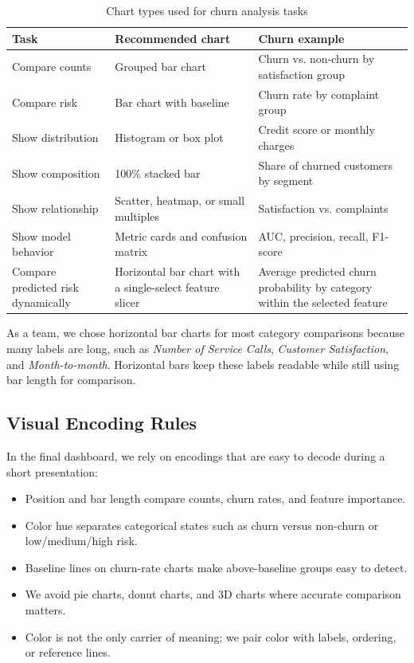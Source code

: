 \begin{table}[h]
\centering
\caption{Chart types used for churn analysis tasks}
\begin{tabularx}{\textwidth}{p{}p{}X}
\toprule
\textbf{Task} & \textbf{Recommended chart} & \textbf{Churn example} \\
\midrule
Compare counts & Grouped bar chart & Churn vs. non-churn by satisfaction group \\
Compare risk & Bar chart with baseline & Churn rate by complaint group \\
Show distribution & Histogram or box plot & Credit score or monthly charges \\
Show composition & 100\% stacked bar & Share of churned customers by segment \\
Show relationship & Scatter, heatmap, or small multiples & Satisfaction vs. complaints \\
Show model behavior & Metric cards and confusion matrix & AUC, precision, recall, F1-score \\
Compare predicted risk dynamically & Horizontal bar chart with a single-select feature slicer & Average predicted churn probability by category within the selected feature \\
\bottomrule
\end{tabularx}
\end{table}

As a team, we chose horizontal bar charts for most category comparisons because
many labels are long, such as \textit{Number of Service Calls},
\textit{Customer Satisfaction}, and \textit{Month-to-month}. Horizontal bars
keep these labels readable while still using bar length for comparison.

\subsection{Visual Encoding Rules}
In the final dashboard, we rely on encodings that are easy to decode during a
short presentation:
\begin{itemize}
  \item Position and bar length compare counts, churn rates, and
  feature importance.
  \item Color hue separates categorical states such as churn versus
  non-churn or low/medium/high risk.
  \item Baseline lines on churn-rate charts make above-baseline groups easy to
  detect.
  \item We avoid pie charts, donut charts, and 3D charts where accurate
  comparison matters.
  \item Color is not the only carrier of meaning; we pair color with
  labels, ordering, or reference lines.
\end{itemize}

